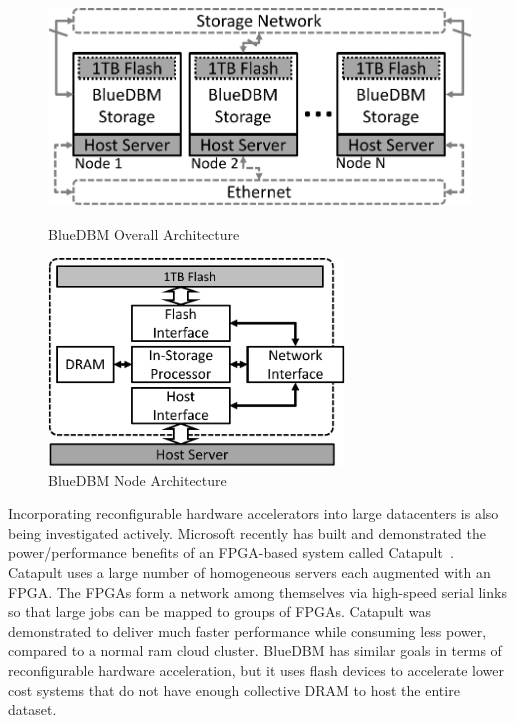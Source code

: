 \begin{figure}[t!]
\centering
\vspace{0pt}
\begin{minipage}[c]{.4\paperwidth}
\begin{center}
	\includegraphics[width=\textwidth]{figures/architecture_small-crop.pdf}
	\caption{BlueDBM Overall Architecture}
	\label{fig:architecture}
\end{center}
\end{minipage}\hfill
\vspace{0pt}
\begin{minipage}[c]{.4\paperwidth}
\begin{center}
	\includegraphics[width=0.7\textwidth]{figures/architecture_node-crop.pdf}
	\caption{BlueDBM Node Architecture}
	\label{fig:architecture_node}
\end{center}
\end{minipage}
\end{figure}



Incorporating reconfigurable hardware accelerators into large datacenters is also being investigated actively. Microsoft recently has built and
demonstrated the power/performance benefits of an FPGA-based system called
Catapult~\cite{msr_catapult}.  Catapult uses a large number of homogeneous
servers each augmented with an FPGA.  The FPGAs form a network among themselves
via high-speed serial links so that large jobs can be mapped to groups of FPGAs.
Catapult was demonstrated to deliver much faster performance while consuming
less power, compared to a normal ram cloud cluster. BlueDBM has similar
goals in terms of reconfigurable hardware acceleration, but it uses flash
devices to accelerate lower cost systems that do not have enough collective DRAM
to host the entire dataset.

